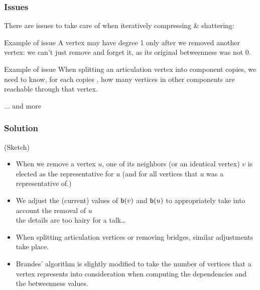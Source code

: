 \begin{frame}
  \frametitle{Issues}
  There are issues to take care of when iteratively compressing \& shattering:
  \begin{block}{Example of issue}
    A vertex may have degree 1 only after we removed another vertex: we can't
    just remove and forget it, as its original betweenness was not 0.
  \end{block}
  \pause
  \begin{block}{Example of issue}
    When splitting an articulation vertex into component copies, we need to know,
    for each copies , how many vertices in other components are reachable through
    that vertex.
  \end{block}
  ... and more
\end{frame}

\begin{frame}
  \frametitle{Solution}
  (Sketch)
  \begin{itemize}
    \item When we remove a vertex $u$, one of its neighbors (or an identical vertex)
      $v$ is elected as the representative for $u$ (and for all vertices that $u$
      was a representative of.)
    \item We adjust the (current) values of $\mathsf{b}(v)$ and $\mathsf{b}(u)$ to
      appropriately take into account the removal of $u$\\
      \qquad the details are too hairy for a talk\ldots
    \item When splitting articulation vertices or removing bridges, similar
      adjustments take place.
    \item Brandes' algorithm is slightly modified to take the number of vertices
      that a vertex represents into consideration when computing the
      dependencies and the betweenness values.
  \end{itemize}
\end{frame}

